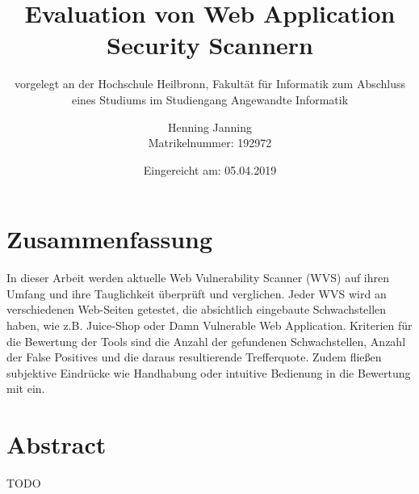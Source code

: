 \documentclass[12pt,oneside,a4paper,parskip]{scrbook}
\def\BaAuthor{Henning Janning}
\def\BaTitle{Evaluation von Web Application Security Scannern}
\def\BaSupervisorOne{Prof. Andreas Mayer}
\def\BaSupervisorTwo{Susanne Steuer (M.Sc.) }
\def\BaDeadline{05.04.2019}
\def\MatNr{192972}
\begin{document}


\frontmatter
\titlehead{%
  {Hochschule Heilbronn\\
   Fakultät für Informatik}}
\subject{Bachelorarbeit}
\title{\BaTitle\\[15mm]}
\subtitle{\normalsize{vorgelegt an der Hochschule Heilbronn, Fakultät für Informatik zum Abschluss eines Studiums im Studiengang Angewandte Informatik}}
\author{\BaAuthor\\
\normalsize{Matrikelnummer: \MatNr}}
\date{\normalsize{Eingereicht am: \BaDeadline}}
\publishers{
  \normalsize{Erstpr\"{u}fer: \BaSupervisorOne}\\
  \normalsize{Zweitpr\"{u}ferin: \BaSupervisorTwo}\\
}


\maketitle



\section*{Zusammenfassung}

In dieser Arbeit werden aktuelle Web Vulnerability Scanner (WVS) auf ihren Umfang und ihre Tauglichkeit überprüft und verglichen. Jeder WVS wird an verschiedenen Web-Seiten getestet, die absichtlich eingebaute Schwachstellen haben, wie z.B. Juice-Shop oder Damn Vulnerable Web Application. Kriterien für die Bewertung der Tools sind die Anzahl der gefundenen Schwachstellen, Anzahl der False Positives und die daraus resultierende Trefferquote. Zudem fließen subjektive Eindrücke wie Handhabung oder intuitive Bedienung in die Bewertung mit ein.

\section*{Abstract}
TODO


\setcounter{secnumdepth}{3}
\setcounter{tocdepth}{3}
\tableofcontents

\listoffigures
{}

\listoftables
{}
\end{document}
